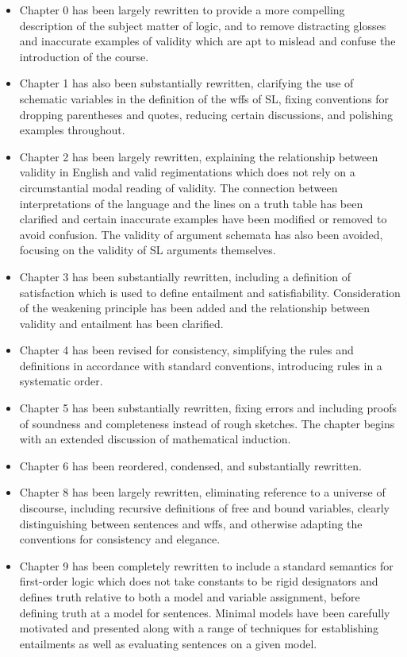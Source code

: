 \begin{itemize}
  \item Chapter 0 has been largely rewritten to provide a more compelling description of the subject matter of logic, and to remove distracting glosses and inaccurate examples of validity which are apt to mislead and confuse the introduction of the course.
  \item Chapter 1 has also been substantially rewritten, clarifying the use of schematic variables in the definition of the wffs of SL, fixing conventions for dropping parentheses and quotes, reducing certain discussions, and polishing examples throughout.
  \item Chapter 2 has been largely rewritten, explaining the relationship between validity in English and valid regimentations which does not rely on a circumstantial modal reading of validity. The connection between interpretations of the language and the lines on a truth table has been clarified and certain inaccurate examples have been modified or removed to avoid confusion. The validity of argument schemata has also been avoided, focusing on the validity of SL arguments themselves.
  \item Chapter 3 has been substantially rewritten, including a definition of satisfaction which is used to define entailment and satisfiability. Consideration of the weakening principle has been added and the relationship between validity and entailment has been clarified. 
  \item Chapter 4 has been revised for consistency, simplifying the rules and definitions in accordance with standard conventions, introducing rules in a systematic order.
  \item Chapter 5 has been substantially rewritten, fixing errors and including proofs of soundness and completeness instead of rough sketches. The chapter begins with an extended discussion of mathematical induction.
  \item Chapter 6 has been reordered, condensed, and substantially rewritten.
  \item Chapter 8 has been largely rewritten, eliminating reference to a universe of discourse, including recursive definitions of free and bound variables, clearly distinguishing between sentences and wffs, and otherwise adapting the conventions for consistency and elegance.
  \item Chapter 9 has been completely rewritten to include a standard semantics for first-order logic which does not take constants to be rigid designators and defines truth relative to both a model and variable assignment, before defining truth at a model for sentences. Minimal models have been carefully motivated and presented along with a range of techniques for establishing entailments as well as evaluating sentences on a given model.

\end{itemize}
